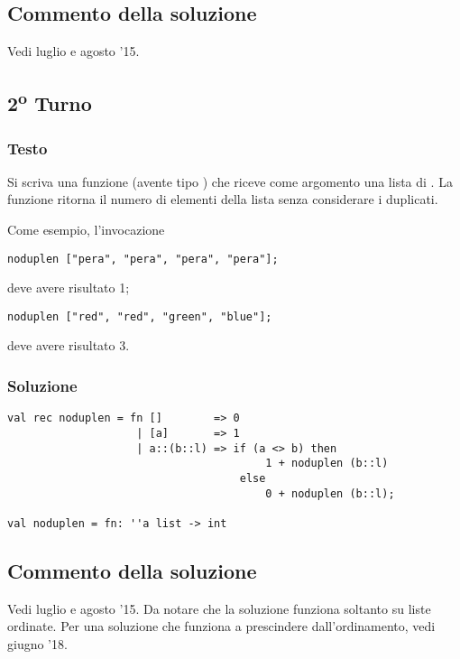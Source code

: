 \subsection{Commento della soluzione}

Vedi luglio e agosto '15.


\subsection{2\textsuperscript{o} Turno}

\subsubsection{Testo}

Si scriva una funzione  (avente tipo ) che riceve come argomento una lista di .
La funzione  ritorna il numero di elementi della lista senza considerare i duplicati.

\medskip
Come esempio, l'invocazione

\begin{lstlisting}
noduplen ["pera", "pera", "pera", "pera"];
\end{lstlisting}

deve avere risultato 1;

\begin{lstlisting}
noduplen ["red", "red", "green", "blue"];
\end{lstlisting}

deve avere risultato 3.

\subsubsection{Soluzione}

\begin{lstlisting}[style = SML, caption = {Definizione della funzione \sml{noduplen}}]
val rec noduplen = fn []		=> 0
					| [a]		=> 1
					| a::(b::l)	=> if (a <> b) then
										1 + noduplen (b::l)
									else
										0 + noduplen (b::l);

val noduplen = fn: ''a list -> int
\end{lstlisting}

\subsection{Commento della soluzione}

Vedi luglio e agosto '15.
Da notare che la soluzione funziona soltanto su liste ordinate. Per una soluzione che funziona a prescindere dall'ordinamento, vedi giugno '18.
